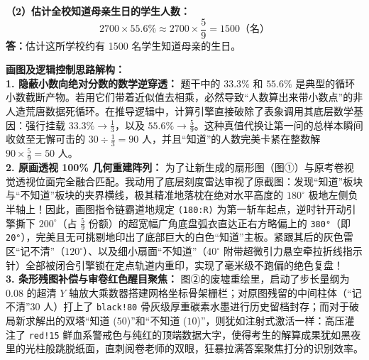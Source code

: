\begin{center}
\end{center}

\vspace{0.4cm}
\textbf{（2）估计全校知道母亲生日的学生人数：}
\[
2700 \times 55.6\% \approx 2700 \times \frac{5}{9} = 1500 \text{（名）}
\]
\textbf{答：}估计这所学校约有 1500 名学生知道母亲的生日。

\vspace{0.4cm}
{\small\color{blue!70!black}
\textbf{画图及逻辑控制思路解构：}\\
\textbf{1. 隐蔽小数向绝对分数的数学逆穿透：} 题干中的 $33.3\%$ 和 $55.6\%$ 是典型的循环小数截断产物。若用它们带着近似值去相乘，必然导致“人数算出来带小数点”的非人造荒唐数据死循环。在推导逻辑中，计算引擎直接破除了表象调用其底层数学基因：强行挂载 $33.3\% \rightarrow \frac{1}{3}$，以及 $55.6\% \rightarrow \frac{5}{9}$。这种真值代换让第一问的总样本瞬间收敛至无懈可击的 $30 \div \frac{1}{3} = 90$ 人，并且“知道”的人数完美卡紧在整数解 $90 \times \frac{5}{9} = 50$ 人。\\
\textbf{2. 原画透视 100\% 几何重建阵列：} 为了让新生成的扇形图（图①）与原考卷视觉透视位面完全融合匹配。我动用了底层刻度雷达审视了原截图：发现“知道”板块与“不知道”板块的夹界横线，极其精准地落枕在绝对水平高度的 $180^\circ$ 极地左侧负半轴上！因此，画图指令链霸道地规定 \texttt{(180:R)} 为第一斩车起点，逆时针开动引擎撕下 $200^\circ$（占 $\frac{5}{9}$ 份额）的超宽幅广角底盘弧衣直达正右方略偏上的 \texttt{380°}（即 \texttt{20°}），完美且无可挑剔地印出了底部巨大的白色“知道”主板。紧跟其后的灰色雷区“记不清”（$120^\circ$）、以及细小扇面“不知道”（$40^\circ$ 附带超微引力悬空牵拉折线指示针）全部被闭合引擎锁在定点轨道内重印，实现了毫米级不跑偏的绝色复盘！\\
\textbf{3. 条形残图补偿与审卷红色醒目聚焦：} 图②的废墟重绘里，启动了步长量纲为 $0.08$ 的超清 $Y$ 轴放大乘数器搭建网格坐标骨架栅栏；对原图残留的中间柱体（“记不清”$30$ 人）打上了 \texttt{black!80} 骨灰级厚重碳素水墨进行历史留档封存；而对于破局新求解出的双塔“知道 ($50$)”和“不知道 ($10$)”，则犹如注射式激活一样：高压灌注了 \texttt{red!15} 鲜血系警戒色与纯红的顶端数据大字，使得考生的解算成果犹如黑夜里的光柱般跳脱纸面，直刺阅卷老师的双眼，狂暴拉满答案聚焦打分的识别效率。
}

